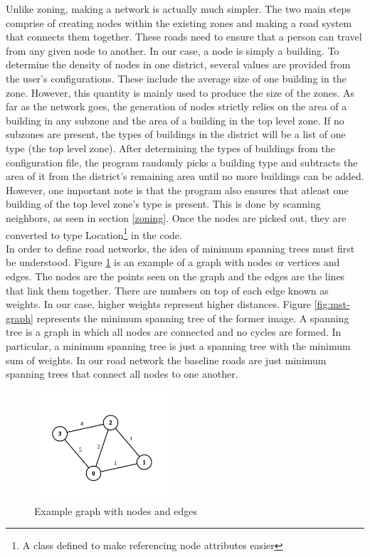 \documentclass[11pt]{article}
\begin{document}
\begin{multicols}{2}
    \quad Unlike zoning, making a network is actually much simpler. The two main steps comprise of creating nodes within the existing zones and making a road system that connects them together. These roads need to ensure that a person can travel from any given node to another. In our case, a node is simply a building. To determine the density of nodes in one district, several values are provided from the user's configurations. These include the average size of one building in the zone. However, this quantity is mainly used to produce the size of the zones. As far as the network goes, the generation of nodes strictly relies on the area of a building in any subzone and the area of a building in the top level zone. If no subzones are present, the types of buildings in the district will be a list of one type (the top level zone). After determining the types of buildings from the configuration file, the program randomly picks a building type and subtracts the area of it from the district's remaining area until no more buildings can be added. However, one important note is that the program also ensures that atleast one building of the top level zone's type is present. This is done by scanning neighbors, as seen in section \ref{zoning}. Once the nodes are picked out, they are converted to type Location\footnote{A class defined to make referencing node attributes easier} in the code.\\

    \quad In order to define road networks, the idea of minimum spanning trees must first be understood. Figure \ref{fig:full-graph} is an example of a graph with nodes or vertices and edges. The nodes are the points seen on the graph and the edges are the lines that link them together. There are numbers on top of each edge known as weights. In our case, higher weights represent higher distances. Figure \ref{fig:mst-graph} represents the minimum spanning tree of the former image. A spanning tree is a graph in which all nodes are connected and no cycles are formed. In particular, a minimum spanning tree is just a spanning tree with the minimum sum of weights. In our road network the baseline roads are just minimum spanning trees that connect all nodes to one another.

    \begin{figure}[H]
        \centering
        \includegraphics[width=0.45\textwidth]{images/graph.png}
        \caption{Example graph with nodes and edges \cite{graphs}}
        \label{fig:full-graph}
    \end{figure}


\end{multicols}
\end{document}
